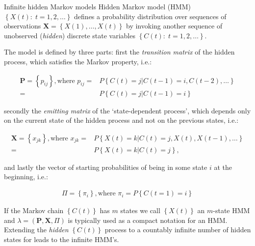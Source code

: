 \begin{remark}{Infinite hidden Markov models\label{ref:infinite_hidden_markov}}
Hidden Markov model (HMM) $\left\{ X\left(t\right):\; t=1,2,\ldots\right\}$ defines a probability distribution over sequences of observations $\mathbf{X}=\left\{ X(1), \ldots,X(t) \right\}$ by invoking another sequence of unobserved (\emph{hidden}) discrete state variables $\left\{ C\left(t\right):\; t=1,2,\ldots\right\}$.
 
The model is defined by three parts: first the \emph{transition matrix} of the hidden process, which satisfies the Markov property, i.e.:

\begin{align}
\mathbf{P}=\left\{ p_{ij}\right\} ,\text{where }p_{ij}=& P\left\{ C\left(t\right)=j|C\left(t-1\right)=i,C\left(t-2\right),\ldots \right\} \nonumber \\ 
=& P\left\{ C\left(t\right)=j|C\left(t-1\right)=i\right\} 
\label{eq:hmm_trans}
\end{align}

\noindent
secondly the \emph{emitting matrix} of the `state-dependent process', which depends only on the current state of the hidden process and not on the previous states, i.e.:

\begin{align}
\mathbf{X}=\left\{ x_{jk}\right\} ,\text{where }x_{jk}=& P\left\{ X\left(t\right)=k|C\left(t\right)=j,X\left(t\right),X\left(t-1\right),\ldots \right\} \nonumber \\
=&P\left\{ X\left(t\right)=k|C\left(t\right)=j\right\} ,
\label{eq:hmm_emit}
\end{align}

\noindent
and lastly the vector of starting probabilities of being in some state $i$ at the beginning, i.e.:

\begin{align}
\Pi=\left\{ \pi_{i}\right\} ,\text{where }\pi_{i}=P\left\{ C\left(t=1\right)=i\right\} 
\label{eq:hmm_start}
\end{align}

\noindent
If the Markov chain $\left\{ C\left(t\right) \right\}$ has $m$ states we call $\left\{ X\left(t\right) \right\}$ an $m$-state HMM and $\lambda=\left(\mathbf{P},\mathbf{X},\Pi\right)$ is typically used as a compact notation for an HMM.
Extending  the \emph{hidden} $\left\{ C\left(t\right) \right\}$ process to a countably infinite number of hidden states for leads to the infinite HMM's.
\end{remark}


